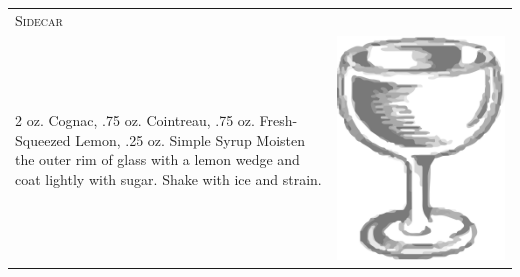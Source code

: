 \documentclass{article}
\begin{document}
\begin{tabular}{p{2in} p{0.5in}}
  \multicolumn{2}{p{3in}}{\centering\Huge\textsc{Sidecar}} \\ 
  
   \vspace{-0.1in}2 oz. Cognac, .75 oz. Cointreau, .75 oz.  Fresh-Squeezed
    Lemon, .25 oz. Simple Syrup Moisten the outer rim of glass with a
    lemon wedge and coat lightly with sugar. Shake with ice and
    strain. &  \vspace{-0.1in} \includegraphics{coupe.png}
\end{tabular}
\end{document}

